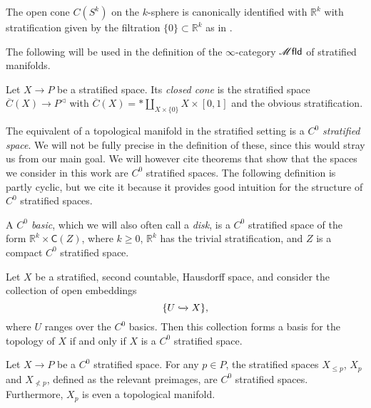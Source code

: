 \documentclass[../text]{subfiles}
\begin{document}
\begin{example}
    The open cone $C(S^k)$ on the $k$-sphere is canonically identified with $\mathbb{R}^k$ with stratification given by the filtration $\{0\}\subset\mathbb{R}^k$ as in .
\end{example}

The following will be used in the definition of the $\infty$-category $\mfld$ of stratified manifolds.

\begin{definition}
    Let $X\to P$ be a stratified space. Its \emph{closed cone} is the stratified space $\overline{C}(X)\to P^{\vartriangleleft}$ with $\overline{C}(X)=\ast\amalg_{X\times\{0\}}X\times[0,1]$ and the obvious stratification.
\end{definition}

The equivalent of a topological manifold in the stratified setting is a \emph{$C^0$ stratified space}. We will not be fully precise in the definition of these, since this would stray us from our main goal. We will however cite theorems that show that the spaces we consider in this work are $C^0$ stratified spaces. The following definition is partly cyclic, but we cite it because it provides good intuition for the structure of $C^0$ stratified spaces.

\begin{definition}
    A \emph{$C^0$ basic}, which we will also often call a \emph{disk}, is a $C^0$ stratified space of the form $\mathbb{R}^k \times \mathsf{C}(Z)$, where $k \geq 0$, $\mathbb{R}^k$ has the trivial stratification, and $Z$ is a compact $C^0$ stratified space.
\end{definition}

\begin{theorem}\label{thm:basics_give_basis}
    Let $X$ be a stratified, second countable, Hausdorff space, and consider the collection of open embeddings
    \begin{equation}
        \{ U \xhookrightarrow{} X\},
    \end{equation}
    where $U$ ranges over the $C^0$ basics. Then this collection forms a basis for the topology of $X$ if and only if $X$ is a $C^0$ stratified space.
\end{theorem}

\begin{theorem}
    Let $X \rightarrow P$ be a $C^0$ stratified space. For any $p \in P$, the stratified spaces $X_{\leq p}$, $X_{p}$ and $X_{\nless p}$, defined as the relevant preimages, are $C^0$ stratified spaces. Furthermore, $X_p$ is even a topological manifold.
\end{theorem}
\end{document}
